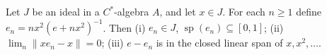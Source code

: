 Let $J$ be an ideal in a $C^*$-algebra $A$, and let $x \in J$. For each $n \geq 1$ define $e_n = nx^2(e + nx^2)^{-1}$. Then (i) $e_n \in J$, $\operatorname{sp}(e_n) \subseteq [0,1]$; (ii) $\lim_n \|x e_n - x\| = 0$; (iii) $e - e_n$ is in the closed linear span of $x, x^2, \ldots$.
